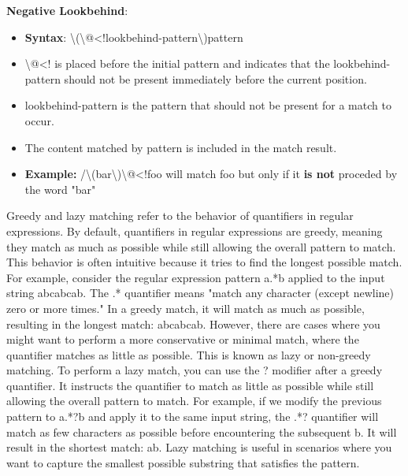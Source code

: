 \documentclass{report}
\begin{document}
    \bigbreak \noindent 
    \textbf{Negative Lookbehind}:
    \begin{itemize}
        \item \textbf{Syntax}: \textbackslash(\textbackslash @<!lookbehind-pattern\textbackslash)pattern
        \item \textbackslash @<! is placed before the initial pattern and indicates that the lookbehind-pattern should not be present immediately before the current position.
        \item lookbehind-pattern is the pattern that should not be present for a match to occur.
        \item The content matched by pattern is included in the match result.
        \item \textbf{Example:} /\textbackslash(bar\textbackslash)\textbackslash @<!foo will match foo but only if it \textbf{is not} proceded by the word "bar"
    \end{itemize}




    \pagebreak
    \bigbreak
    \noindent

    Greedy and lazy matching refer to the behavior of quantifiers in regular expressions.
    \bigbreak \noindent 
    By default, quantifiers in regular expressions are greedy, meaning they match as much as possible while still allowing the overall pattern to match. This behavior is often intuitive because it tries to find the longest possible match.
    \bigbreak \noindent 
    For example, consider the regular expression pattern a.*b applied to the input string abcabcab. The .* quantifier means "match any character (except newline) zero or more times." In a greedy match, it will match as much as possible, resulting in the longest match: abcabcab.
    \bigbreak \noindent 
    However, there are cases where you might want to perform a more conservative or minimal match, where the quantifier matches as little as possible. This is known as lazy or non-greedy matching.
    \bigbreak \noindent 
    To perform a lazy match, you can use the ? modifier after a greedy quantifier. It instructs the quantifier to match as little as possible while still allowing the overall pattern to match.
    \bigbreak \noindent 
    For example, if we modify the previous pattern to a.*?b and apply it to the same input string, the .*? quantifier will match as few characters as possible before encountering the subsequent b. It will result in the shortest match: ab.
    \bigbreak \noindent 
    Lazy matching is useful in scenarios where you want to capture the smallest possible substring that satisfies the pattern.
    \bigbreak \noindent 
\end{document}
